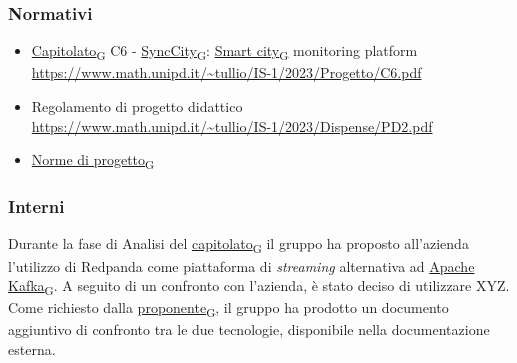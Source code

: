 \subsubsection{Normativi}
\begin{itemize}
	\item \href{https://7last.github.io/docs/rtb/documentazione-interna/glossario\#capitolato}{Capitolato\textsubscript{G}} C6 - \href{https://7last.github.io/docs/rtb/documentazione-interna/glossario\#synccity}{SyncCity\textsubscript{G}}: \href{https://7last.github.io/docs/rtb/documentazione-interna/glossario\#smart-city}{Smart city\textsubscript{G}} monitoring platform\\
	      \url{https://www.math.unipd.it/~tullio/IS-1/2023/Progetto/C6.pdf}
	\item Regolamento di progetto didattico\\
	      \url{https://www.math.unipd.it/~tullio/IS-1/2023/Dispense/PD2.pdf}
	\item \href{https://7last.github.io/docs/rtb/documentazione-interna/glossario\#norme-di-progetto}{Norme di progetto\textsubscript{G}}
\end{itemize}

\subsubsection{Interni}
Durante la fase di Analisi del \href{https://7last.github.io/docs/rtb/documentazione-interna/glossario\#capitolato}{capitolato\textsubscript{G}} il gruppo ha proposto all'azienda
l'utilizzo di Redpanda come piattaforma di \textit{streaming} alternativa ad \href{https://7last.github.io/docs/rtb/documentazione-interna/glossario\#apache-kafka}{Apache Kafka\textsubscript{G}}.
A seguito di un confronto con l'azienda, è stato deciso di utilizzare XYZ.\\ %
Come richiesto dalla \href{https://7last.github.io/docs/rtb/documentazione-interna/glossario\#proponente}{proponente\textsubscript{G}}, il gruppo ha prodotto un documento aggiuntivo di
confronto tra le due tecnologie, disponibile nella documentazione esterna. %





